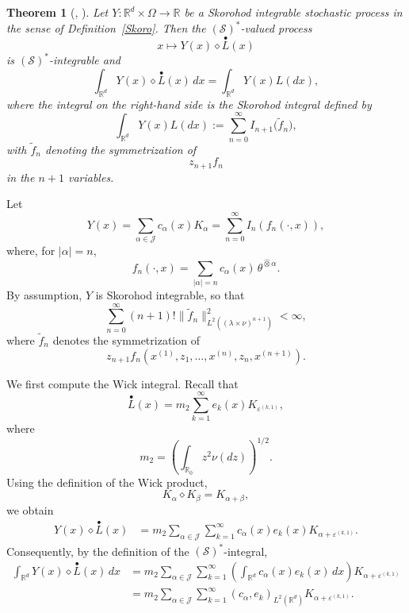 \documentclass[12pt]{article}%
\newtheorem{theorem}{Theorem}[section]
\newcommand{\dproof}{\noindent {Proof.} \quad}
\numberwithin{equation}{section}
\begin{document}
\begin{theorem}[{\cite{LOU}, \cite{B}}]
\label{wick}
Let $Y:\mathbb{R}^d\times\Omega\to\mathbb{R}$ be a Skorohod integrable
stochastic process in the sense of Definition~\ref{Skoro}. Then the
$(\mathcal{S})^{*}$-valued process
\[
x\longmapsto Y(x)\diamond\overset{\bullet}{L}(x)
\]
is $(\mathcal{S})^{*}$-integrable and
\begin{equation}
\label{3.66}
\int_{\mathbb{R}^d}
Y(x)\diamond\overset{\bullet}{L}(x)\,dx
=
\int_{\mathbb{R}^d}Y(x)L(dx),
\end{equation}
where the integral on the right-hand side is the Skorohod integral
defined by
\[
\int_{\mathbb{R}^d}Y(x)L(dx)
:=
\sum_{n=0}^{\infty}
I_{n+1}\big(\widetilde{f}_n\big),
\]
with $\widetilde{f}_n$ denoting the symmetrization of
\[
z_{n+1}f_n
\]
in the $n+1$ variables.
\end{theorem}
\dproof
Let
\[
Y(x)=\sum_{\alpha\in\mathcal J}c_\alpha(x)K_\alpha
     =\sum_{n=0}^{\infty}I_n(f_n(\cdot,x)),
\]
where, for $|\alpha|=n$,
\begin{equation}
f_n(\cdot,x)
=
\sum_{|\alpha|=n}
c_\alpha(x)\,
\theta^{\hat\otimes\alpha}.
\label{fn-expansion}
\end{equation}
By assumption, $Y$ is Skorohod integrable, so that
\[
\sum_{n=0}^{\infty}
(n+1)!
\|\widetilde f_n\|^2_{L^2((\lambda\times\nu)^{n+1})}
<\infty,
\]
where $\widetilde f_n$ denotes the symmetrization of
\[
z_{n+1}f_n
(x^{(1)},z_1,\ldots,x^{(n)},z_n,x^{(n+1)}).
\]

We first compute the Wick integral. Recall that
\[
\overset{\bullet}L(x)
=
m_2\sum_{k=1}^{\infty}
e_k(x)K_{\varepsilon^{(k,1)}},
\]
where
\[
m_2=\left(\int_{\mathbb R_0}z^2\nu(dz)\right)^{1/2}.
\]
Using the definition of the Wick product,
\[
K_\alpha\diamond K_\beta=K_{\alpha+\beta},
\]
we obtain
\begin{align}
Y(x)\diamond\overset{\bullet} L(x)
&=
m_2
\sum_{\alpha\in\mathcal J}
\sum_{k=1}^{\infty}
c_\alpha(x)e_k(x)
K_{\alpha+\varepsilon^{(k,1)}}.
\end{align}
Consequently, by the definition of the $(\mathcal S)^*$-integral,
\begin{align}
\int_{\mathbb R^d}
Y(x)\diamond\overset{\bullet} L(x)\,dx
&=
m_2
\sum_{\alpha\in\mathcal J}
\sum_{k=1}^{\infty}
\left(
\int_{\mathbb R^d}
c_\alpha(x)e_k(x)\,dx
\right)
K_{\alpha+\varepsilon^{(k,1)}} \\
&=
m_2
\sum_{\alpha\in\mathcal J}
\sum_{k=1}^{\infty}
(c_\alpha,e_k)_{L^2(\mathbb R^d)}
K_{\alpha+\varepsilon^{(k,1)}}.
\label{wick-expansion}
\end{align}
\end{document}
